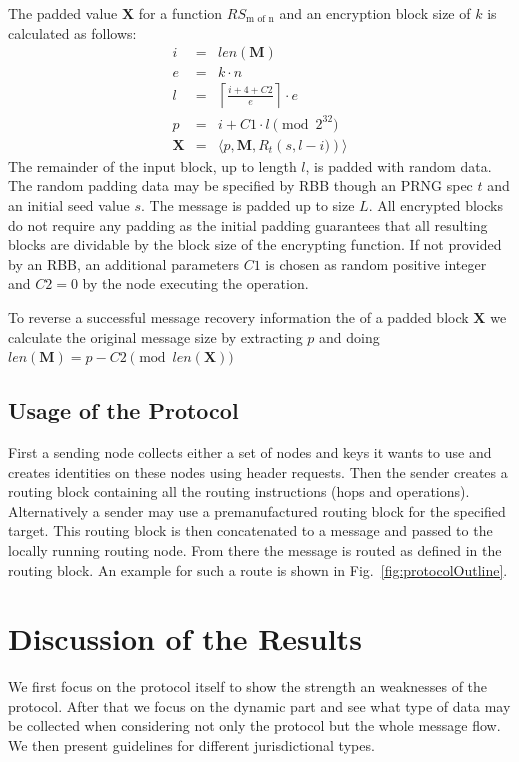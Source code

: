 \documentclass[10pt,journal,compsoc]{IEEEtran}
\begin{document}
The padded value $\mathbf{X}$ for a function $RS_{\text{m of n}}$ and an encryption block size of $k$ is calculated as follows:
\begin{eqnarray}
	i          & = & len(\mathbf{M})\\
	e          & = & k \cdot n\\
	l          & = & \left\lceil\frac{i + 4 + C2 }{e}\right\rceil\cdot e\\
	p          & = & i + C1 \cdot l \pmod{2^{32}}\\
	\mathbf{X} & = & \langle p,\mathbf{M},R_{t}\left(s,l-i)\right)\rangle
\end{eqnarray}	
The remainder of the input block, up to length $l$, is padded with random data. The random padding data may be specified by RBB though an PRNG spec $t$ and an initial seed value $s$. The message is padded up to size $L$. All encrypted blocks do not require any padding as the initial padding guarantees that all resulting blocks are dividable by the block size of the encrypting function. If not provided by an RBB, an additional parameters $C1$ is chosen as random positive integer and $C2=0$  by the node executing the operation.

To reverse a successful message recovery information the of a padded block $\mathbf{X}$ we calculate the original message size by extracting $p$ and doing $len(\mathbf{M})=p - C2 \pmod{ len(\mathbf{X})}$

\subsection{Usage of the Protocol}
First a sending node collects either a set of nodes and keys it wants to use and creates identities on these nodes using header requests. Then the sender creates a routing block containing all the routing instructions (hops and operations). Alternatively a sender may use a premanufactured routing block for the specified target. This routing block is then concatenated to a message and passed to the locally running routing node. From there the message is routed as defined in the routing block. An example for such a route is shown in Fig.~\ref{fig:protocolOutline}.

\section{Discussion of the Results}
We first focus on the protocol itself to show the strength an weaknesses of the protocol. After that we focus on the dynamic part and see what type of data may be collected when considering not only the protocol but the whole message flow. We then present guidelines for different jurisdictional types.
\end{document}
